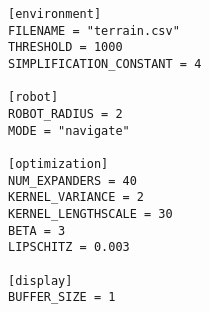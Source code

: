 \begin{appendices}
\begin{verbatim}
[environment]
FILENAME = "terrain.csv"
THRESHOLD = 1000
SIMPLIFICATION_CONSTANT = 4

[robot]
ROBOT_RADIUS = 2
MODE = "navigate"

[optimization]
NUM_EXPANDERS = 40
KERNEL_VARIANCE = 2
KERNEL_LENGTHSCALE = 30
BETA = 3
LIPSCHITZ = 0.003

[display]
BUFFER_SIZE = 1
\end{verbatim}



\end{appendices}
